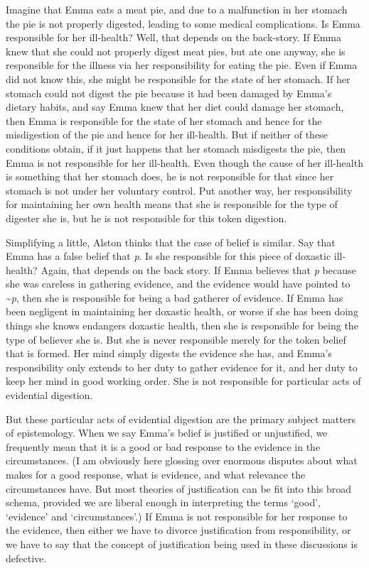 \documentclass[
  11pt,
  letterpaper,
  DIV=11,
  numbers=noendperiod,
  oneside]{scrartcl}
\begin{document}
Imagine that Emma eats a meat pie, and due to a malfunction in her
stomach the pie is not properly digested, leading to some medical
complications. Is Emma responsible for her ill-health? Well, that
depends on the back-story. If Emma knew that she could not properly
digest meat pies, but ate one anyway, she is responsible for the illness
via her responsibility for eating the pie. Even if Emma did not know
this, she might be responsible for the state of her stomach. If her
stomach could not digest the pie because it had been damaged by Emma's
dietary habits, and say Emma knew that her diet could damage her
stomach, then Emma is responsible for the state of her stomach and hence
for the misdigestion of the pie and hence for her ill-health. But if
neither of these conditions obtain, if it just happens that her stomach
misdigests the pie, then Emma is not responsible for her ill-health.
Even though the cause of her ill-health is something that her stomach
does, he is not responsible for that since her stomach is not under her
voluntary control. Put another way, her responsibility for maintaining
her own health means that she is responsible for the type of digester
she is, but he is not responsible for this token digestion.

Simplifying a little, Alston thinks that the case of belief is similar.
Say that Emma has a false belief that \emph{p}. Is she responsible for
this piece of doxastic ill-health? Again, that depends on the back
story. If Emma believes that \emph{p} because she was careless in
gathering evidence, and the evidence would have pointed to
\textasciitilde{}\emph{p}, then she is responsible for being a bad
gatherer of evidence. If Emma has been negligent in maintaining her
doxastic health, or worse if she has been doing things she knows
endangers doxastic health, then she is responsible for being the type of
believer she is. But she is never responsible merely for the token
belief that is formed. Her mind simply digests the evidence she has, and
Emma's responsibility only extends to her duty to gather evidence for
it, and her duty to keep her mind in good working order. She is not
responsible for particular acts of evidential digestion.

But these particular acts of evidential digestion are the primary
subject matters of epistemology. When we say Emma's belief is justified
or unjustified, we frequently mean that it is a good or bad response to
the evidence in the circumstances. (I am obviously here glossing over
enormous disputes about what makes for a good response, what is
evidence, and what relevance the circumstances have. But most theories
of justification can be fit into this broad schema, provided we are
liberal enough in interpreting the terms `good', `evidence' and
`circumstances'.) If Emma is not responsible for her response to the
evidence, then either we have to divorce justification from
responsibility, or we have to say that the concept of justification
being used in these discussions is defective.
\end{document}
